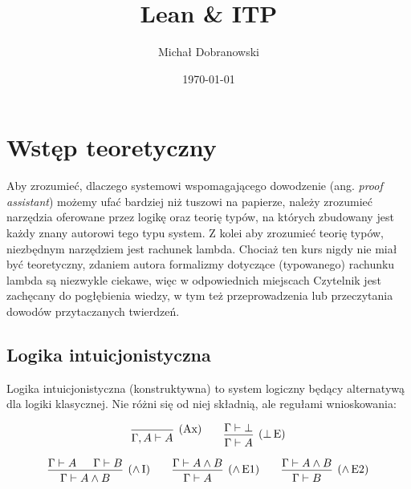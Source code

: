 \documentclass[polish,pretty]{angav}
\title{Lean \& ITP}
\author{Michał Dobranowski}
\date{\today}
\begin{document}
\maketitle
\tableofcontents
\newpage

\section{Wstęp teoretyczny}

Aby zrozumieć, dlaczego systemowi wspomagającego dowodzenie (ang. \textit{proof assistant}) możemy ufać bardziej niż tuszowi na papierze, należy zrozumieć narzędzia oferowane przez logikę oraz teorię typów, na których zbudowany jest każdy znany autorowi tego typu system.
Z kolei aby zrozumieć teorię typów, niezbędnym narzędziem jest rachunek lambda.
Chociaż ten kurs nigdy nie miał być teoretyczny, zdaniem autora formalizmy dotyczące (typowanego) rachunku lambda są niezwykle ciekawe, więc w odpowiednich miejscach Czytelnik jest zachęcany do pogłębienia wiedzy, w tym też przeprowadzenia lub przeczytania dowodów przytaczanych twierdzeń.

\subsection{Logika intuicjonistyczna}

Logika intuicjonistyczna (konstruktywna) to system logiczny będący alternatywą dla logiki klasycznej. Nie różni się od niej składnią, ale regułami wnioskowania:

\[
\begin{prooftree}
    \infer0[(Ax)]{\Gamma,A\vdash A}
\end{prooftree}
\qquad
\begin{prooftree}
    \hypo{\Gamma\vdash \bot}
    \infer1[($\bot\!$ E)]{\Gamma\vdash A}
\end{prooftree}
\]

\[
\begin{prooftree}
    \hypo{\Gamma\vdash A}
    \hypo{\Gamma\vdash B}
    \infer2[($\land\!$ I)]{\Gamma\vdash A \land B}
\end{prooftree}
\qquad
\begin{prooftree}
    \hypo{\Gamma\vdash A \land B}
    \infer1[($\land\!$ E1)]{\Gamma\vdash A}
\end{prooftree}
\qquad
\begin{prooftree}
    \hypo{\Gamma\vdash A \land B}
    \infer1[($\land\!$ E2)]{\Gamma\vdash B}
\end{prooftree}
\]
\end{document}
